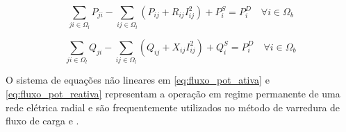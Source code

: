 \begin{equation}
    \sum_{ji\in\Omega_{l}}P_{ji} - \sum_{ij\in\Omega_{l}}(P_{ij} + R_{ij}I_{ij}^{2}) + P_{i}^{S} = P_{i}^{D}\quad\forall i \in\Omega_{b}\label{eq:fluxo_pot_ativa}  
\end{equation}


\begin{equation}
    \sum_{ji\in\Omega_{l}}Q_{ji} - \sum_{ij\in\Omega_{l}}(Q_{ij} + X_{ij}I_{ij}^{2}) + Q_{i}^{S} = P_{i}^{D}\quad\forall i \in\Omega_{b}\label{eq:fluxo_pot_reativa}
\end{equation}

O sistema de equações não lineares em \ref{eq:fluxo_pot_ativa} e \ref{eq:fluxo_pot_reativa} representam a operação em regime permanente de uma rede elétrica radial e são frequentemente utilizados no método de varredura de fluxo de carga \cite{Shirmohammadi1988ANetworks} e \cite{Cespedes1990NewNetworks}.